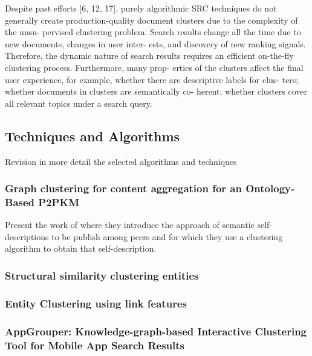 \documentclass[runningheads]{llncs}
\begin{document}

Despite past efforts [6, 12, 17], purely algorithmic SRC techniques do not generally create production-quality document clusters due to the complexity of the unsu- pervised clustering problem. Search results change all the time due to new documents, changes in user inter- ests, and discovery of new ranking signals. Therefore, the dynamic nature of search results requires an efficient on-the-fly clustering process. Furthermore, many prop- erties of the clusters affect the final user experience, for example, whether there are descriptive labels for clus- ters; whether documents in clusters are semantically co- herent; whether clusters cover all relevant topics under a search query. \cite{Chang}


\subsection{Techniques and Algorithms}\label{algorithms}
Revision in more detail the selected algorithms and techniques 


\subsubsection{Graph clustering for content aggregation for an Ontology-Based P2PKM}\label{content-aggregation}
Present the work of \cite{Schmitz} where they introduce the approach of semantic self-descriptions to be publish among peers and for which they use a clustering algorithm to obtain that self-description.


\subsubsection{Structural similarity clustering entities} \label{structural-similarity}


\subsubsection{Entity Clustering using link features} \label{entity-clustering}

\subsubsection{AppGrouper: Knowledge-graph-based Interactive Clustering Tool for Mobile App Search Results} \cite{Chang}
\end{document}

